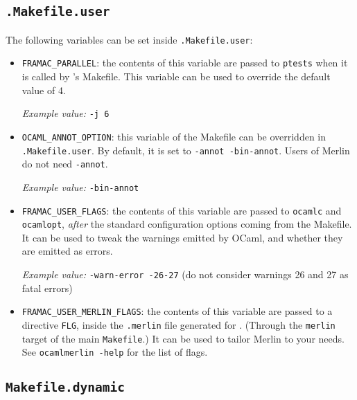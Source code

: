 
\subsection{\texttt{.Makefile.user}}

The following variables can be set inside \texttt{.Makefile.user}:
\begin{itemize}
\item \texttt{FRAMAC\_PARALLEL}: the contents of this variable are passed
to \texttt{ptests} when it is called by \framac's Makefile. This variable
can be used to override the default value of 4.

\emph{Example value:} \texttt{-j 6}

\item \texttt{OCAML\_ANNOT\_OPTION}: this variable of the Makefile
can be overridden in \texttt{.Makefile.user}.
By default, it is set to \texttt{-annot -bin-annot}. Users of
\textsf{Merlin} do not need \texttt{-annot}.

\emph{Example value:} \texttt{-bin-annot}

\item \texttt{FRAMAC\_USER\_FLAGS}: the contents of this variable are
passed to \texttt{ocamlc} and \texttt{ocamlopt}, \emph{after} the standard
configuration options coming from the Makefile. It can be used to tweak
the warnings emitted by OCaml, and whether they are emitted as errors.

\emph{Example value:} \texttt{-warn-error -26-27} (do not consider warnings
26 and 27 as fatal errors)

\item \texttt{FRAMAC\_USER\_MERLIN\_FLAGS}: the contents of this variable are
passed to a directive \texttt{FLG}, inside the \texttt{.merlin} file generated
for \framac. (Through  the \texttt{merlin} target of the
main \texttt{Makefile}.) It can be used to tailor \textsf{Merlin}
to your needs. See \texttt{ocamlmerlin -help} for the list of flags.


\end{itemize}

\subsection{\texttt{Makefile.dynamic}}
\label{make:dynamic}

